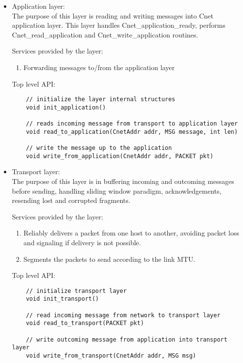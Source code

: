 \documentclass{article}
\begin{document}
\begin{itemize}
  \item Application layer: \\
		The purpose of this layer is reading and writing messages into Cnet
		application layer. This layer handles Cnet\_application\_ready, performs
		Cnet\_read\_application and Cnet\_write\_application routines.
		
		Services provided by the layer:
		\begin{enumerate}
		  \item Forwarding messages to/from the application layer 
		\end{enumerate}
	
	Top level API:
	\begin{verbatim}
    // initialize the layer internal structures
    void init_application()
		
    // reads incoming message from transport to application layer
    void read_to_application(CnetAddr addr, MSG message, int len) 
    
    // write the message up to the application
    void write_from_application(CnetAddr addr, PACKET pkt)    
	\end{verbatim}
		
\item	Transport layer: \\
		The purpose of this layer is in buffering incoming and outcoming messages
		before sending, handling sliding window paradigm, acknowledgements, resending
		lost and corrupted fragments.
		
		Services provided by the layer:
    \begin{enumerate}
      \item Reliably delivers a packet from one host to another, avoiding packet
      loss and signaling if delivery is not possible.
      \item Segments the packets to send according to the link MTU.
    \end{enumerate}
		
		Top level API:
  \begin{verbatim}
    // initialize transport layer
    void init_transport()
		
    // read incoming message from network to transport layer
    void read_to_transport(PACKET pkt)
    
    // write outcoming message from application into transport layer
    void write_from_transport(CnetAddr addr, MSG msg) 
  \end{verbatim}
		

\end{itemize}
\end{document}
